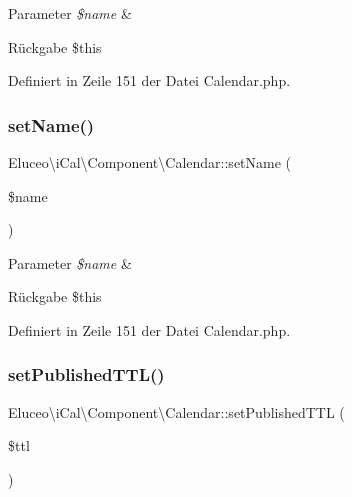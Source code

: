 \begin{DoxyParams}{Parameter}
{\em \$name} & \\
\hline
\end{DoxyParams}
\begin{DoxyReturn}{Rückgabe}
\$this 
\end{DoxyReturn}


Definiert in Zeile 151 der Datei Calendar.\+php.

\mbox{\label{class_eluceo_1_1i_cal_1_1_component_1_1_calendar_adf80b9aa9dc6481fe45b78142ae1aec2}} 
\subsubsection{\texorpdfstring{set\+Name()}{setName()}\hspace{0.1cm}{\footnotesize\ttfamily [3/3]}}
{\footnotesize\ttfamily Eluceo\textbackslash{}i\+Cal\textbackslash{}\+Component\textbackslash{}\+Calendar\+::set\+Name (\begin{DoxyParamCaption}\item[{}]{\$name }\end{DoxyParamCaption})}


\begin{DoxyParams}{Parameter}
{\em \$name} & \\
\hline
\end{DoxyParams}
\begin{DoxyReturn}{Rückgabe}
\$this 
\end{DoxyReturn}


Definiert in Zeile 151 der Datei Calendar.\+php.

\mbox{\label{class_eluceo_1_1i_cal_1_1_component_1_1_calendar_afc9e8e19e33559fed2c32ff4e2fedab8}} 
\subsubsection{\texorpdfstring{set\+Published\+T\+T\+L()}{setPublishedTTL()}\hspace{0.1cm}{\footnotesize\ttfamily [1/3]}}
{\footnotesize\ttfamily Eluceo\textbackslash{}i\+Cal\textbackslash{}\+Component\textbackslash{}\+Calendar\+::set\+Published\+T\+TL (\begin{DoxyParamCaption}\item[{}]{\$ttl }\end{DoxyParamCaption})}


